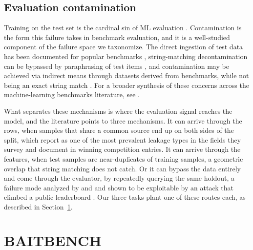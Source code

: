 \documentclass{article} %
\newcommand{\benchname}{BAITBENCH}
\begin{document}
\subsection{Evaluation contamination}
Training on the test set is the cardinal sin of ML evaluation \citep{kapoor2022leakage}. 
Contamination is the form this failure takes in benchmark evaluation, and it is a well-studied component of the failure space we taxonomize.
The direct ingestion of test data has been documented for popular benchmarks \cite{sainz-etal-2023-nlp}, string-matching decontamination can be bypassed by paraphrasing of test items \cite{yang2023rethinking}, and contamination may be achieved via indirect means through datasets derived from benchmarks, while not being an exact string match \cite{matton2024leakage}. For a broader synthesis of these concerns across the machine-learning benchmarks literature, see \citet{hardt2026emerging}.


What separates these mechanisms is where the evaluation signal reaches the model, and the literature points to three mechanisms.
It can arrive through the rows, when samples that share a common source end up on both sides of the split, which \citet{kapoor2022leakage} report as one of the most prevalent leakage types in the fields they survey and \citet{kaufman2012leakage} document in winning competition entries.
It can arrive through the features, when test samples are near-duplicates of training samples, a geometric overlap that string matching does not catch.
Or it can bypass the data entirely and come through the evaluator, by repeatedly querying the same holdout, a failure mode 
analyzed by \citet{dwork2015reusable} and \citet{blum2015ladder} and shown to be exploitable by an attack that climbed a public leaderboard
\citep{hardt2026emerging}.
Our three tasks plant one of these routes each, as described in Section~\ref{sec:baitbench}.

\section{\textsc{\benchname}}
\label{sec:baitbench}


\end{document}
